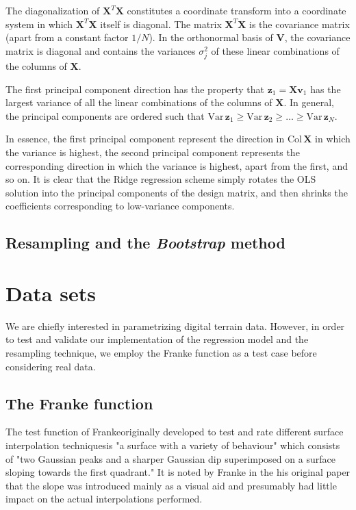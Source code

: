 \documentclass[a4paper]{article}
\begin{document}
\begin{multicols}{2}
The diagonalization of $\mathbf{X}^T\mathbf{X}$ constitutes a coordinate transform into a coordinate system in which $\mathbf{X}^T\mathbf{X}$ itself is diagonal. The matrix $\mathbf{X}^T\mathbf{X}$ is the covariance matrix (apart from a constant factor $1/N$). In the orthonormal basis of $\mathbf{V}$, the covariance matrix is diagonal and contains the variances $\sigma_j^2$ of these linear combinations of the columns of $\mathbf{X}$.

The first principal component direction has the property that $\mathbf{z}_1=\mathbf{X}\mathbf{v}_1$ has the largest variance of all the linear combinations of the columns of $\mathbf{X}$. In general, the principal components are ordered such that $\text{Var}\,\mathbf{z}_1\ge \text{Var}\,\mathbf{z}_2\ge\dots \ge\text{Var}\,\mathbf{z}_N$.

In essence, the first principal component represent the direction in $\text{Col}\,\mathbf{X}$ in which the variance is highest, the second principal component represents the corresponding direction in which the variance is highest, apart from the first, and so on. It is clear that the Ridge regression scheme simply rotates the OLS solution into the principal components of the design matrix, and then shrinks the coefficients corresponding to low-variance components. 

\subsection{Resampling and the \textit{Bootstrap} method \label{sect:resampling}}
\lipsum[3]

\section{Data sets}
We are chiefly interested in parametrizing digital terrain data. However, in order to test and validate our implementation of the regression model and the resampling technique, we employ the Franke function\autocite{franke1979critical} as a test case before considering real data.

\subsection{The Franke function \label{sect:franke}}
The test function of Franke\textemdash originally developed to test and rate different surface interpolation techniques\textemdash is "a surface with a variety of behaviour" which consists of "two Gaussian peaks and a sharper Gaussian dip superimposed on a surface sloping towards the first quadrant."\autocite{franke1979critical} It is noted by Franke in the his original paper that the slope was introduced mainly as a visual aid and presumably had little impact on the actual interpolations performed. 


\end{multicols}
\end{document}
